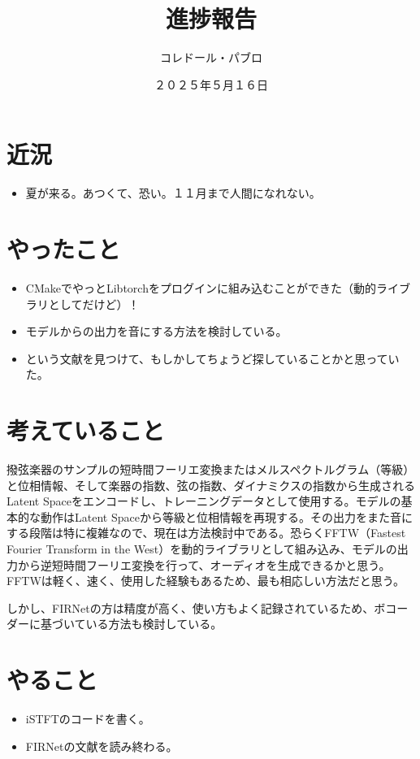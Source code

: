 \documentclass[a4paper, 12pt]{article}
\title{進捗報告}
\author{コレドール・パブロ}
\date{２０２５年５月１６日}
\begin{document}
\maketitle

\section*{近況}
\begin{itemize}
    \item 夏が来る。あつくて、恐い。１１月まで人間になれない。
\end{itemize} 

\section*{やったこと}
\begin{itemize}
    \item CMakeでやっとLibtorchをプログインに組み込むことができた（動的ライブラリとしてだけど）！
    \item モデルからの出力を音にする方法を検討している。
    \item \cite{FIRNet}という文献を見つけて、もしかしてちょうど探していることかと思っていた。
\end{itemize}

\section*{考えていること}

撥弦楽器のサンプルの短時間フーリエ変換またはメルスペクトルグラム（等級）と位相情報、そして楽器の指数、弦の指数、ダイナミクスの指数から生成されるLatent Spaceをエンコードし、トレーニングデータとして使用する。モデルの基本的な動作はLatent Spaceから等級と位相情報を再現する。その出力をまた音にする段階は特に複雑なので、現在は方法検討中である。恐らくFFTW（Fastest Fourier Transform in the West）を動的ライブラリとして組み込み、モデルの出力から逆短時間フーリエ変換を行って、オーディオを生成できるかと思う。FFTWは軽く、速く、使用した経験もあるため、最も相応しい方法だと思う。

しかし、FIRNet\cite{FIRNet}の方は精度が高く、使い方もよく記録されているため、ボコーダーに基づいている方法も検討している。

\section*{やること}
\begin{itemize}
    \item iSTFTのコードを書く。
    \item FIRNetの文献を読み終わる。
\end{itemize}

\section{}



\end{document}
